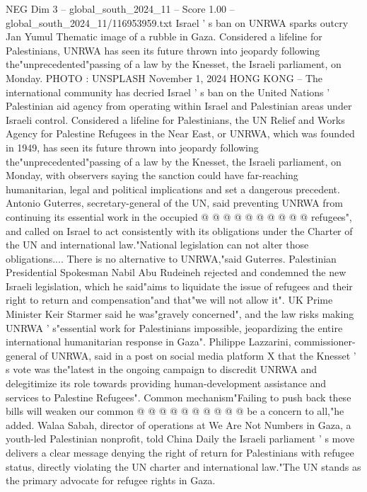 \begin{textsample}{NEG Dim 3 – global\_south\_2024\_11 – Score 1.00 – global\_south\_2024\_11/116953959.txt}  \label{ex:f3_neg_158}
Israel ' s ban on UNRWA sparks outcry Jan Yumul Thematic image of a rubble in Gaza.
Considered a lifeline for Palestinians, UNRWA has seen its future thrown into jeopardy following the"unprecedented"passing of a law by the Knesset, the Israeli parliament, on Monday.
PHOTO : UNSPLASH November 1, 2024 HONG KONG -- The international community has decried Israel ' s ban on the United Nations ' Palestinian aid agency from operating within Israel and Palestinian areas under Israeli control.
Considered a lifeline for Palestinians, the UN Relief and Works Agency for Palestine Refugees in the Near East, or UNRWA, which was founded in 1949, has seen its future thrown into jeopardy following the"unprecedented"passing of a law by the Knesset, the Israeli parliament, on Monday, with observers saying the sanction could have far-reaching humanitarian, legal and political implications and set a dangerous precedent.
Antonio Guterres, secretary-general of the UN, said preventing UNRWA from continuing its essential work in the occupied @ @ @ @ @ @ @ @ @ @ refugees", and called on Israel to act consistently with its obligations under the Charter of the UN and international law."National legislation can not alter those obligations....
There is no alternative to UNRWA,"said Guterres.
Palestinian Presidential Spokesman Nabil Abu Rudeineh rejected and condemned the new Israeli legislation, which he said"aims to liquidate the issue of refugees and their right to return and compensation"and that"we will not allow it".
UK Prime Minister Keir Starmer said he was"gravely concerned", and the law risks making UNRWA ' s"essential work for Palestinians impossible, jeopardizing the entire international humanitarian response in Gaza".
Philippe Lazzarini, commissioner-general of UNRWA, said in a post on social media platform X that the Knesset ' s vote was the"latest in the ongoing campaign to discredit UNRWA and delegitimize its role towards providing human-development assistance and services to Palestine Refugees".
Common mechanism"Failing to push back these bills will weaken our common @ @ @ @ @ @ @ @ @ @ be a concern to all,"he added.
Walaa Sabah, director of operations at We Are Not Numbers in Gaza, a youth-led Palestinian nonprofit, told China Daily the Israeli parliament ' s move delivers a clear message denying the right of return for Palestinians with refugee status, directly violating the UN charter and international law."The UN stands as the primary advocate for refugee rights in Gaza.

\end{textsample}
